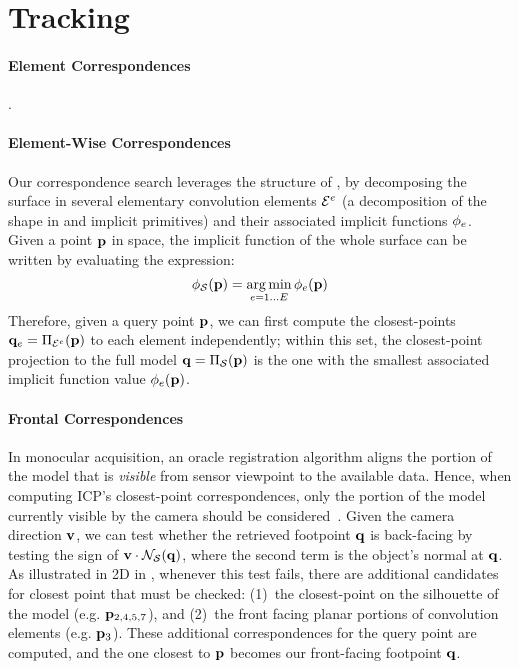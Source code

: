 \section{Tracking}


\paragraph{Element Correspondences}
.

\paragraph{Element-Wise Correspondences}
Our correspondence search leverages the structure of , by decomposing the surface in several elementary convolution elements $\mathcal{E}^e$ (a decomposition of the shape in  and  implicit primitives) and their associated implicit functions $\phi_e$. Given a point $\mathbf{p}$ in space, the implicit function of the whole surface can be written by evaluating the expression:
\begin{equation}
\phi_{\mathcal{S}}(\mathbf{p}) = \operatorname*{arg\,min}_{e=1 \dots E} \phi_e(\mathbf{p})
\label{eq:piecewise}
\end{equation}
Therefore, given a query point $\mathbf{p}$, we can first compute the closest-points $\mathbf{q}_e = \Pi_{\mathcal{E}^e}(\mathbf{p})$ to each element independently; within this set, the closest-point projection to the full model $\mathbf{q} = \Pi_{\mathcal{S}}(\mathbf{p})$ is the one with the smallest associated implicit function value $\phi_e(\mathbf{p})$.

\paragraph{Frontal Correspondences}
In monocular acquisition, an oracle registration algorithm aligns the portion of the model that is \emph{visible} from sensor viewpoint to the available data. Hence, when computing ICP's closest-point correspondences, only the portion of the model currently visible by the camera should be considered~\cite{tagliasacchi2015robust}. Given the camera direction $\mathbf{v}$, we can test whether the retrieved footpoint $\mathbf{q}$ is back-facing by testing the sign of $\mathbf{v} \cdot \mathcal{N}_{\mathcal{S}}(\mathbf{q})$, where the second term is the object's normal at $\mathbf{q}$. As illustrated in 2D in , whenever this test fails, there are additional candidates for closest point that must be checked: (1)~the closest-point on the silhouette of the model (e.g. $\mathbf{p}_{2,4,5,7}$), and (2)~the front facing planar portions of convolution elements (e.g. $\mathbf{p}_{3}$). These additional correspondences for the query point are computed, and the one closest to $\mathbf{p}$ becomes our front-facing footpoint $\mathbf{q}$.




